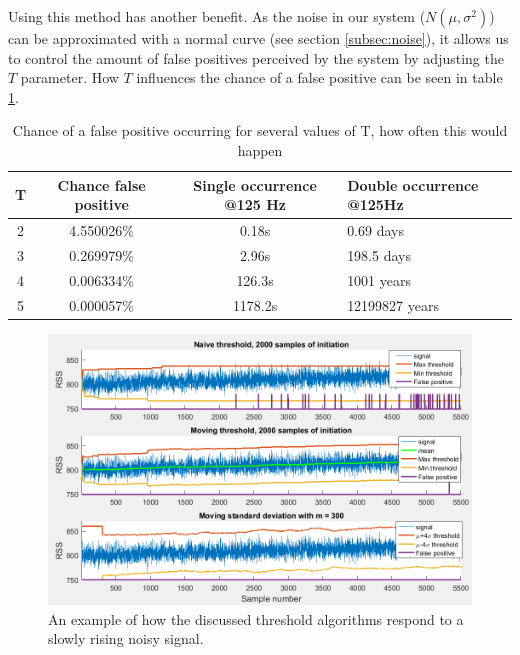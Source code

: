 Using this method has another benefit. As the noise in our system ($N(\mu,\sigma^2)$) can be approximated with a normal curve (see section \ref{subsec:noise}), it allows us to control the amount of false positives perceived by the system by adjusting the $T$ parameter. How $T$ influences the chance of a false positive can be seen in table \ref{tab:Tresholds}.

\begin{table}
	\centering
	\label{tab:Tresholds}
	\begin{tabular}{cccl}
		\hline
		T   & Chance false positive & Single occurrence @125 Hz & Double occurrence @125Hz\\ \hline
		2   & 4.550026\%            & 0.18s                     & 0.69 days               \\
		3   & 0.269979\%            & 2.96s                     & 198.5 days              \\
		4   & 0.006334\%            & 126.3s                    & 1001 years              \\
		5   & 0.000057\%            & 1178.2s                   & 12199827 years          \\ \hline
	\end{tabular}
	\caption{Chance of a false positive occurring for several values of T, how often this would happen}
\end{table}




\begin{figure}
	\includegraphics[width=\textwidth]{pics/NaiveVSsigmaThreshold.png}
	\caption{An example of how the discussed threshold algorithms respond to a slowly rising noisy signal.}
	\label{fig:Threshold}
\end{figure}

